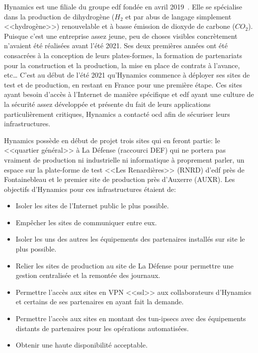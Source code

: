 \documentclass[12pt, oneside, a4paper, titlepage]{report}
\begin{document}
Hynamics est une filiale du groupe \gls{edf} fondée en avril 2019~\cite{hy}.
Elle se spécialise dans la production de dihydrogène ($H_2$ et par abus de
langage simplement <<hydrogène>>) renouvelable et à basse émission de dioxyde de
carbone ($CO_2$). Puisque c'est une entreprise assez jeune, peu de choses
visibles concrètement n'avaient été réalisées avant l'été 2021. Ses deux
premières années ont été consacrées à la conception de leurs plates-formes, la
formation de partenariats pour la construction et la production, la mise en
place de contrats à l'avance, etc\ldots{} C'est au début de l'été 2021
qu'Hynamics commence à déployer ses sites de test et de production, en restant
en France pour une première étape. Ces sites ayant besoin d'accès à l'Internet
de manière spécifique et \gls{edf} ayant une culture de la sécurité assez
développée et présente du fait de leurs applications particulièrement critiques,
Hynamics a contacté \acrlong{ocd} afin de sécuriser leurs infrastructures.

Hynamics possède en début de projet trois sites qui en feront partie: le
<<quartier général>> à La Défense (raccourci DEF) qui ne portera pas vraiment de
production ni industrielle ni informatique à proprement parler, un espace sur la
plate-forme de test <<Les Renardières>> (RNRD) d'\gls{edf} près de Fontainebleau
et le premier site de production près d'Auxerre (AUXR). Les objectifs d'Hynamics
pour ces infrastructures étaient de:

\begin{itemize}
    \item Isoler les sites de l'Internet public le plus possible.
    \item Empêcher les sites de communiquer entre eux.
    \item Isoler les uns des autres les équipements des partenaires installés
        sur site le plus possible.
    \item Relier les sites de production au site de La Défense pour permettre
        une gestion centralisée et la remontée des journaux.
    \item Permettre l'accès aux sites en VPN <<\gls{ssl}>> aux collaborateurs
        d'Hynamics et certains de ses partenaires en ayant fait la demande.
    \item Permettre l'accès aux sites en montant des \glspl{tun-ipsec} avec des
        équipements distants de partenaires pour les opérations automatisées.
    \item Obtenir une haute disponibilité acceptable.
\end{itemize}
\end{document}
